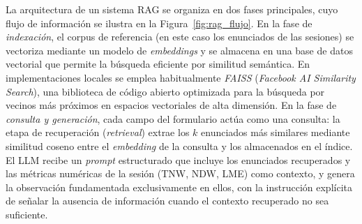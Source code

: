La arquitectura de un sistema \ac{RAG} se organiza en dos fases principales, cuyo
flujo de información se ilustra en la Figura~\ref{fig:rag_flujo}. En la fase de
\emph{indexación}, el corpus de referencia (en este caso los enunciados de las sesiones)
se vectoriza mediante un modelo de \emph{embeddings} y se almacena en una base de datos
vectorial que permite la búsqueda eficiente por similitud semántica. En implementaciones
locales se emplea habitualmente \emph{FAISS} (\emph{Facebook AI Similarity Search}), una
biblioteca de código abierto optimizada para la búsqueda por vecinos más próximos en
espacios vectoriales de alta dimensión. En la fase de \emph{consulta y generación}, cada
campo del formulario actúa como una consulta: la etapa de recuperación (\emph{retrieval})
extrae los $k$ enunciados más similares mediante similitud coseno entre el
\emph{embedding} de la consulta y los almacenados en el índice. El \ac{LLM} recibe un
\emph{prompt} estructurado que incluye los enunciados recuperados y las métricas numéricas
de la sesión (TNW, NDW, \ac{LME}) como contexto, y genera la observación fundamentada
exclusivamente en ellos, con la instrucción explícita de señalar la ausencia de información
cuando el contexto recuperado no sea suficiente.

